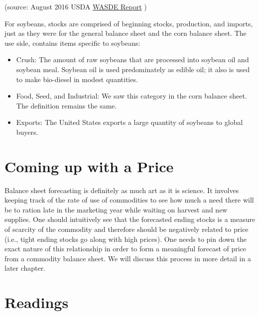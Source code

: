 \documentclass[]{book}
\providecommand{\tightlist}{%
  \setlength{\itemsep}{0pt}\setlength{\parskip}{0pt}}
\theoremstyle{definition}
\theoremstyle{definition}
\theoremstyle{remark}
\begin{document}
(source: August 2016 USDA
\href{http://usda.mannlib.cornell.edu/MannUsda/viewDocumentInfo.do?documentID=1194}{WASDE
Report} )

For soybeans, stocks are comprised of beginning stocks, production, and
imports, just as they were for the general balance sheet and the corn
balance sheet. The use side, contains items specific to soybeans:

\begin{itemize}
\tightlist
\item
  Crush: The amount of raw soybeans that are processed into soybean oil
  and soybean meal. Soybean oil is used predominately as edible oil; it
  also is used to make bio-diesel in modest quantities.
\item
  Food, Seed, and Industrial: We saw this category in the corn balance
  sheet. The definition remains the same.
\item
  Exports: The United States exports a large quantity of soybeans to
  global buyers.
\end{itemize}

\section{Coming up with a Price}\label{coming-up-with-a-price}

Balance sheet forecasting is definitely as much art as it is science. It
involves keeping track of the rate of use of commodities to see how much
a need there will be to ration late in the marketing year while waiting
on harvest and new supplies. One should intuitively see that the
forecasted ending stocks is a measure of scarcity of the commodity and
therefore should be negatively related to price (i.e., tight ending
stocks go along with high prices). One needs to pin down the exact
nature of this relationship in order to form a meaningful forecast of
price from a commodity balance sheet. We will discuss this process in
more detail in a later chapter.

\section{Readings}\label{readings-2}
\end{document}
